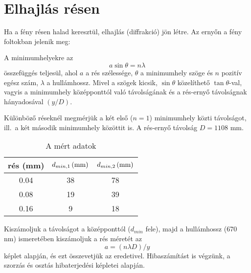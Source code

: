 \documentclass[12pt]{article}
\begin{document}
\section{Elhajlás résen}

Ha a fény résen halad keresztül, elhajlás (diffrakció) jön létre. Az ernyőn a fény foltokban jelenik meg:

\vskip 14mm

A minimumhelyekre az \[ a \sin \theta = n \lambda\] összefüggés teljesül, ahol $a$ a rés szélessége, $\theta$ a minimumhely szöge és $n$ pozitív egész szám, $\lambda$ a hullámhossz. Mivel a szögek kicsik, $\sin\theta$ közelíthető $\tan  \theta$-val, vagyis a minimumhely középponttól való távolságának és a rés-ernyő távolságnak hányadosával $(y/D)$.

Különböző réseknél megmérjük a két első ($n=1$) minimumhely közti távolságot, ill.\ a két második minimumhely közöttit is. A rés-ernyő távolság $D=1108$ mm. 

  
  \begin{table}[H]
    \begin{center}
      \begin{tabular}{|
c|
c|
c|
}
        \hline
        
rés (mm) & 
\ensuremath{\unit[\text{\ensuremath{d_{min,1}}}]{(mm)}} & \ensuremath{\unit[\text{\ensuremath{d_{min,2}}}]{(mm)}}
\\
        \hline\hline
        
0.04
 & 38
 & 78
\\
        \hline
        
0.08
 & 19
 & 39
\\
        \hline
        
0.16
 & 9
 & 18
\\
        \hline
      \end{tabular}
      \caption{A mért adatok}
      \label{tab:}
    \end{center}
  \end{table}

Kiszámoljuk a távolságot a középponttól ($d_{min}$ fele), majd a hullámhossz (670 nm) ismeretében kiszámoljuk a rés méretét az \[a=(n\lambda D )/ y \] képlet alapján, és ezt összevetjük az eredetivel. Hibaszámítást is végzünk, a szorzás és osztás hibaterjedési képletei alapján.
\end{document}
